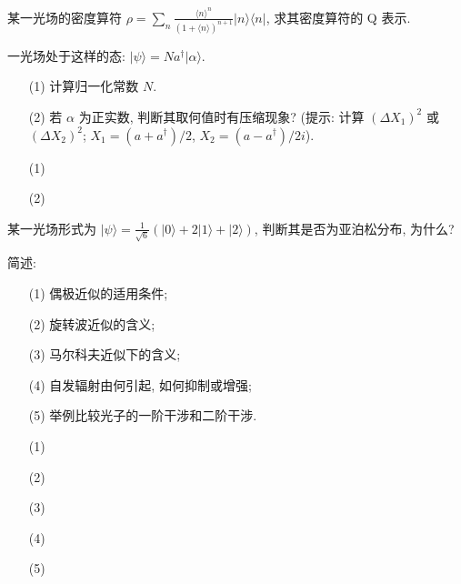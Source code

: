 \documentclass{assignment}
\begin{document}
\begin{prob}
    某一光场的密度算符 $\rho=\sum_n\frac{\langle n\rangle^n}{(1+\langle n\rangle)^{n+1}}\lvert n\rangle\langle n\rvert$, 求其密度算符的 Q 表示.
\end{prob}
\begin{sol}
    
\end{sol}

\begin{prob}
    一光场处于这样的态: $\lvert\psi\rangle=Na^{\dagger}\lvert\alpha\rangle$.
    \begin{itemize}
        \item[(1)] 计算归一化常数 $N$.
        \item[(2)] 若 $\alpha$ 为正实数, 判断其取何值时有压缩现象? (提示: 计算 $(\Delta X_1)^2$ 或 $(\Delta X_2)^2$; $X_1=(a+a^{\dagger})/2$, $X_2=(a-a^{\dagger})/2i$).
    \end{itemize}
\end{prob}
\begin{sol}
    \begin{itemize}
        \item[(1)] 
        \item[(2)] 
    \end{itemize}
\end{sol}

\begin{prob}
    某一光场形式为 $\lvert\psi\rangle=\frac{1}{\sqrt{6}}(\lvert 0\rangle+2\lvert 1\rangle+\lvert 2\rangle)$, 判断其是否为亚泊松分布, 为什么?
\end{prob}
\begin{sol}
    
\end{sol}

\begin{prob}
    简述:
    \begin{itemize}
        \item[(1)] 偶极近似的适用条件;
        \item[(2)] 旋转波近似的含义;
        \item[(3)] 马尔科夫近似下的含义;
        \item[(4)] 自发辐射由何引起, 如何抑制或增强;
        \item[(5)] 举例比较光子的一阶干涉和二阶干涉.
    \end{itemize}
\end{prob}
\begin{sol}
    \begin{itemize}
        \item[(1)] 
        \item[(2)] 
        \item[(3)] 
        \item[(4)] 
        \item[(5)] 
    \end{itemize}
\end{sol}
\end{document}
